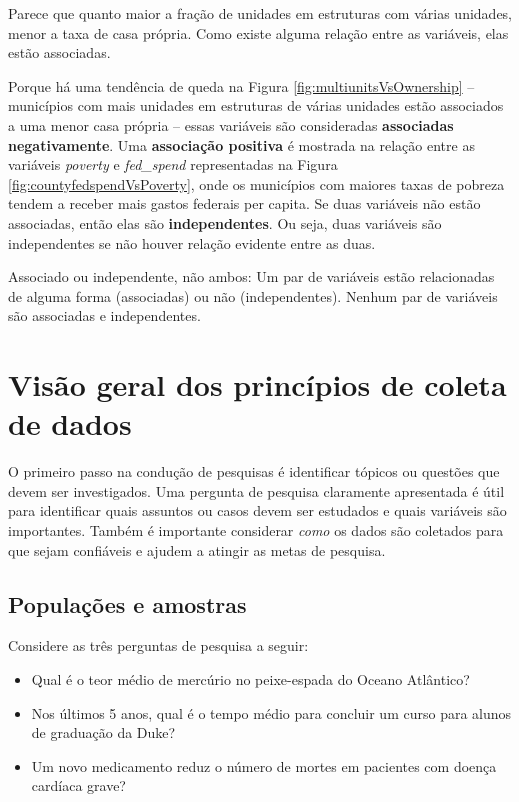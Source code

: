 \documentclass[
]{book}
\theoremstyle{definition}
\theoremstyle{definition}
\theoremstyle{definition}
\theoremstyle{definition}
\theoremstyle{remark}
\begin{document}
Parece que quanto maior a fração de unidades em estruturas com várias unidades, menor a taxa de casa própria. Como existe alguma relação entre as variáveis, elas estão associadas.

Porque há uma tendência de queda na Figura \ref{fig:multiunitsVsOwnership} -- municípios com mais unidades em estruturas de várias unidades estão associados a uma menor casa própria -- essas variáveis são consideradas \textbf{associadas negativamente}. Uma \textbf{associação positiva} é mostrada na relação entre as variáveis \emph{poverty} e \emph{fed\_spend} representadas na Figura \ref{fig:countyfedspendVsPoverty}, onde os municípios com maiores taxas de pobreza tendem a receber mais gastos federais per capita.
Se duas variáveis não estão associadas, então elas são \textbf{independentes}. Ou seja, duas variáveis são independentes se não houver relação evidente entre as duas.

Associado ou independente, não ambos: Um par de variáveis estão relacionadas de alguma forma (associadas) ou não (independentes). Nenhum par de variáveis são associadas e independentes.

\hypertarget{overviewOfDataCollectionPrinciples}{%
\section{Visão geral dos princípios de coleta de dados}\label{overviewOfDataCollectionPrinciples}}

O primeiro passo na condução de pesquisas é identificar tópicos ou questões que devem ser investigados. Uma pergunta de pesquisa claramente apresentada é útil para identificar quais assuntos ou casos devem ser estudados e quais variáveis são importantes. Também é importante considerar \emph{como} os dados são coletados para que sejam confiáveis e ajudem a atingir as metas de pesquisa.

\hypertarget{populationsAndSamples}{%
\subsection{Populações e amostras}\label{populationsAndSamples}}

Considere as três perguntas de pesquisa a seguir:

\begin{itemize}
\item
  Qual é o teor médio de mercúrio no peixe-espada do Oceano Atlântico?
\item
  Nos últimos 5 anos, qual é o tempo médio para concluir um curso para alunos de graduação da Duke?
\item
  Um novo medicamento reduz o número de mortes em pacientes com doença cardíaca grave?
\end{itemize}
\end{document}
